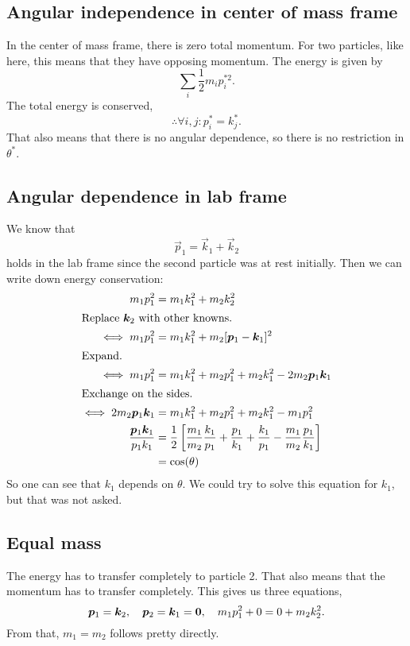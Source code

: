 \documentclass[11pt, english, fleqn, DIV=15, headinclude, BCOR=1.5cm]{scrartcl}
\begin{document}
\subsection{Angular independence in center of mass frame}

In the center of mass frame, there is zero total momentum. For two particles,
like here, this means that they have opposing momentum. The energy is given by
\[
    \sum_i \frac 12 m_i p_i^{*2}.
\]
The total energy is conserved,
\[
    \therefore \forall i, j\colon p_i^* = k_j^*.
\]
That also means that there is no angular dependence, so there is no restriction
in $\theta^*$.

\subsection{Angular dependence in lab frame}

We know that
\[
    \vec p_1 = \vec k_1 + \vec k_2
\]
holds in the lab frame since the second particle was at rest initially. Then we
can write down energy conservation:
\begin{align*}
    m_1 p_1^2 &= m_1 k_1^2 + m_2 k_2^2 \\
    \intertext{%
        Replace $\vec k_2$ with other knowns.
    }
    \iff m_1 p_1^2 &= m_1 k_1^2 + m_2 [\vec p_1 - \vec k_1]^2 \\
    \intertext{%
        Expand.
    }
    \iff m_1 p_1^2 &= m_1 k_1^2 + m_2 p_1^2 + m_2 k_1^2 - 2 m_2 \vec p_1 \vec k_1 \\
    \intertext{%
        Exchange on the sides.
    }
    \iff 2 m_2 \vec p_1 \vec k_1 &= m_1 k_1^2 + m_2 p_1^2 + m_2 k_1^2 - m_1 p_1^2  \\
    \frac{\vec p_1 \vec k_1}{p_1 k_1} &= \frac 12 \sbr{
        \frac{m_1}{m_2} \frac{k_1}{p_1} + \frac{p_1}{k_1} + \frac{k_1}{p_1} -
        \frac{m_1}{m_2} \frac{p_1}{k_1}
    } \\
    &= \cos(\theta)
\end{align*}
So one can see that $k_1$ depends on $\theta$. We could try to solve this
equation for $k_1$, but that was not asked.

\subsection{Equal mass}

The energy has to transfer completely to particle 2. That also means that the
momentum has to transfer completely. This gives us three equations,
\[
    \boldsymbol{p}_1 = \boldsymbol{k}_2
    ,\quad
    \boldsymbol{p}_2 = \boldsymbol{k}_1 = \boldsymbol{0}
    ,\quad
    m_1 p_1^2 + 0 = 0 + m_2 k_2^2.
\]
From that, $m_1 = m_2$ follows pretty directly.
\end{document}
